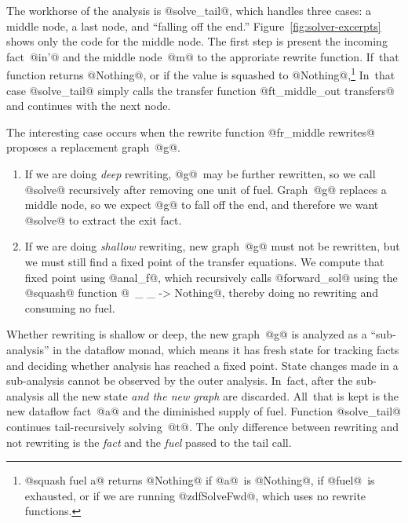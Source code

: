 \documentclass[blockstyle,preprint,nocopyrightspace]{sigplanconf}
\newcommand{\authornote}[1]{{\em #1}}
\def\authornote#1{\unskip\relax}
\newcommand{\norman}[1]{\authornote{NR: #1}}
\let\remark\norman
\newcommand\figref[1]{Figure~\ref{fig:#1}}
\begin{document}
The workhorse of the analysis is @solve_tail@, which handles three
cases: a middle node, a last node, and ``falling off the end.''
\figref{solver-excerpts} shows only the code for the middle node.
The first step is present the incoming fact~@in'@ and the middle
node~@m@ to the approriate rewrite function.
If~that function returns @Nothing@, or if the value is squashed to
@Nothing@,\footnote
{@squash fuel a@ returns @Nothing@ if @a@~is @Nothing@, if @fuel@~is
  exhausted, or if we are running @zdfSolveFwd@, which uses no rewrite
  functions.
}
In~that case @solve_tail@ simply calls the transfer function
@ft_middle_out transfers@ and continues with the next node.



The interesting case occurs when the rewrite function 
@fr_middle rewrites@
proposes a replacement graph~@g@.
\remark{Orphaned text:
and
a list of facts that hold on edges leaving the graph, which is  
 extracted using function @zdfFpLastOuts@.
\iffalse %
In the example above, when the subgraph
@z = 7 + y@ is analyzed, @zdfFpLastOuts@ will contain
the pair $(@L2@, @x == 7@ \land @y == 8@)$.
\fi
}
\begin{enumerate}
\item
If we are doing \emph{deep} rewriting, @g@~may be further rewritten,
so we call @solve@ recursively after removing one unit of fuel.
Graph~@g@ replaces a middle node, so we expect @g@ to fall off the
end, and therefore we want @solve@ to extract the exit fact.
\item
If we are doing \emph{shallow} rewriting,  new graph~@g@ must not be
rewritten, but we must still find a fixed point of the transfer
equations.
We compute that fixed point using @anal_f@, which  recursively calls
@forward_sol@ using the @squash@ function
@\ _ _ -> Nothing@, 
thereby doing no rewriting and consuming no fuel.\remark{Line number
  to where squash is used}
\end{enumerate}
Whether rewriting is shallow or deep, the new graph~@g@ is analyzed as
a ``sub-analysis'' in the dataflow monad, which means it has fresh
state for tracking facts and deciding whether analysis has reached a
fixed point.
State changes made in a sub-analysis cannot be observed by the outer
analysis. 
In~fact, after the sub-analysis all the new state \emph{and the new
  graph} are discarded.
All~that is kept is the new dataflow fact~@a@ and the diminished
supply of fuel.
Function @solve_tail@ continues tail-recursively solving~@t@.
The only difference between rewriting \remark{line number} and not
rewriting \remark{line number} is the
\emph{fact} and the \emph{fuel} passed to the tail call.
\end{document}
